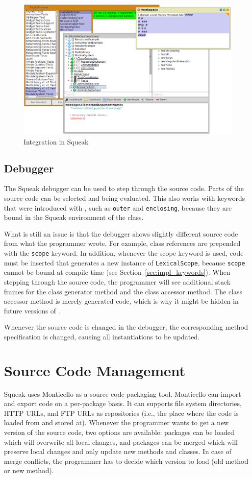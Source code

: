 \begin{figure}[!htp]
	\centering
	\includegraphics[width=\textwidth]{screenshot_integration.png}
	\caption{Integration in Squeak}
	\label{fig:impl_integration}
\end{figure}

\subsection{Debugger}
The Squeak debugger can be used to step through the source code. Parts of the source code can be selected and being evaluated. This also works with keywords that were introduced with \msname, such as \texttt{outer} and \texttt{enclosing}, because they are bound in the Squeak environment of the class.

What is still an issue is that the debugger shows slightly different source code from what the programmer wrote. For example, class references are prepended with the \texttt{scope} keyword. In addition, whenever the scope keyword is used, code must be inserted that generates a new instance of \texttt{LexicalScope}, because \texttt{scope} cannot be bound at compile time (see Section~\ref{sec:impl_keywords}). When stepping through the source code, the programmer will see additional stack frames for the class generator method and the class accessor method. The class accessor method is merely generated code, which is why it might be hidden in future versions of \msname.

Whenever the source code is changed in the debugger, the corresponding method specification is changed, causing all instantiations to be updated.

\section{Source Code Management}
Squeak uses Monticello as a source code packaging tool. Monticello can import and export code on a per-package basis. It can supports file system directories, HTTP URLs, and FTP URLs as repositories (i.e., the place where the code is loaded from and stored at). Whenever the programmer wants to get a new version of the source code, two options are available: packages can be loaded which will overwrite all local changes, and packages can be merged which will preserve local changes and only update new methods and classes. In case of merge conflicts, the programmer has to decide which version to load (old method or new method).


